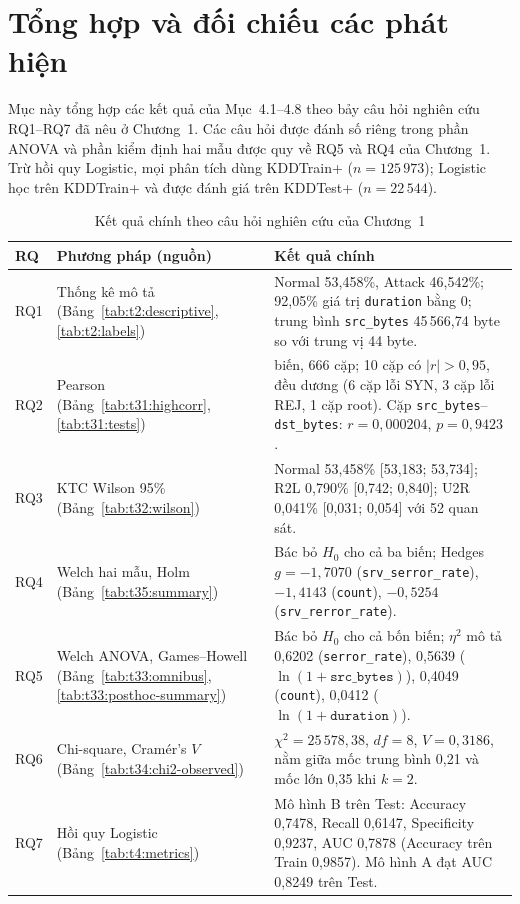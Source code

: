 \documentclass[../main.tex]{subfiles}
\begin{document}
\section{Tổng hợp và đối chiếu các phát hiện}
\label{sec:t5:synthesis}

Mục này tổng hợp các kết quả của Mục~4.1--4.8 theo bảy câu hỏi nghiên cứu RQ1--RQ7 đã nêu ở Chương~1. Các câu hỏi được đánh số riêng trong phần ANOVA và phần kiểm định hai mẫu được quy về RQ5 và RQ4 của Chương~1. Trừ hồi quy Logistic, mọi phân tích dùng KDDTrain+ ($n=125\,973$); Logistic học trên KDDTrain+ và được đánh giá trên KDDTest+ ($n=22\,544$).

\begin{table}[H]
\centering
\caption{Kết quả chính theo câu hỏi nghiên cứu của Chương~1}
\label{tab:t5:synthesis}
\small
\setlength{\tabcolsep}{4pt}
\renewcommand{\arraystretch}{1.25}
\begin{tabularx}{\textwidth}{>{\raggedright\arraybackslash}p{1.1cm}>{\raggedright\arraybackslash}p{3.6cm}>{\raggedright\arraybackslash}X}
\toprule
RQ & Phương pháp (nguồn) & Kết quả chính \\
\midrule
RQ1 & Thống kê mô tả (Bảng~\ref{tab:t2:descriptive}, \ref{tab:t2:labels}) & Normal 53,458\%, Attack 46,542\%; 92,05\% giá trị \texttt{duration} bằng 0; trung bình \texttt{src\_bytes} 45\,566,74 byte so với trung vị 44 byte. \\
RQ2 & Pearson (Bảng~\ref{tab:t31:highcorr}, \ref{tab:t31:tests}) & 37 biến, 666 cặp; 10 cặp có $|r|>0{,}95$, đều dương (6 cặp lỗi SYN, 3 cặp lỗi REJ, 1 cặp root). Cặp \texttt{src\_bytes}--\texttt{dst\_bytes}: $r=0{,}000204$, $p=0{,}9423$. \\
RQ3 & KTC Wilson 95\% (Bảng~\ref{tab:t32:wilson}) & Normal 53,458\% [53,183; 53,734]; R2L 0,790\% [0,742; 0,840]; U2R 0,041\% [0,031; 0,054] với 52 quan sát. \\
RQ4 & Welch hai mẫu, Holm (Bảng~\ref{tab:t35:summary}) & Bác bỏ $H_0$ cho cả ba biến; Hedges $g=-1{,}7070$ (\texttt{srv\_serror\_rate}), $-1{,}4143$ (\texttt{count}), $-0{,}5254$ (\texttt{srv\_rerror\_rate}). \\
RQ5 & Welch ANOVA, Games--Howell (Bảng~\ref{tab:t33:omnibus}, \ref{tab:t33:posthoc-summary}) & Bác bỏ $H_0$ cho cả bốn biến; $\eta^2$ mô tả 0,6202 (\texttt{serror\_rate}), 0,5639 ($\ln(1+\texttt{src\_bytes})$), 0,4049 (\texttt{count}), 0,0412 ($\ln(1+\texttt{duration})$). \\
RQ6 & Chi-square, Cramér's $V$ (Bảng~\ref{tab:t34:chi2-observed}) & $\chi^2=25\,578{,}38$, $df=8$, $V=0{,}3186$, nằm giữa mốc trung bình 0,21 và mốc lớn 0,35 khi $k=2$. \\
RQ7 & Hồi quy Logistic (Bảng~\ref{tab:t4:metrics}) & Mô hình B trên Test: Accuracy 0,7478, Recall 0,6147, Specificity 0,9237, AUC 0,7878 (Accuracy trên Train 0,9857). Mô hình A đạt AUC 0,8249 trên Test. \\
\bottomrule
\end{tabularx}
\end{table}
\end{document}
